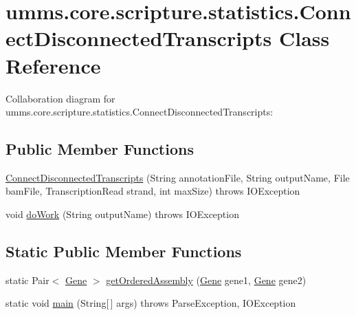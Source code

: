 \hypertarget{classumms_1_1core_1_1scripture_1_1statistics_1_1_connect_disconnected_transcripts}{\section{umms.\+core.\+scripture.\+statistics.\+Connect\+Disconnected\+Transcripts Class Reference}
\label{classumms_1_1core_1_1scripture_1_1statistics_1_1_connect_disconnected_transcripts}
}


Collaboration diagram for umms.\+core.\+scripture.\+statistics.\+Connect\+Disconnected\+Transcripts\+:
\subsection*{Public Member Functions}
\begin{DoxyCompactItemize}
\item 
\hyperlink{classumms_1_1core_1_1scripture_1_1statistics_1_1_connect_disconnected_transcripts_a513b9e39e9fbcfc2db0ccd8135e5b02d}{Connect\+Disconnected\+Transcripts} (String annotation\+File, String output\+Name, File bam\+File, Transcription\+Read strand, int max\+Size)  throws I\+O\+Exception
\item 
void \hyperlink{classumms_1_1core_1_1scripture_1_1statistics_1_1_connect_disconnected_transcripts_a7aca425db9ded34dc2a1010c07859849}{do\+Work} (String output\+Name)  throws I\+O\+Exception
\end{DoxyCompactItemize}
\subsection*{Static Public Member Functions}
\begin{DoxyCompactItemize}
\item 
static Pair$<$ \hyperlink{classumms_1_1core_1_1annotation_1_1_gene}{Gene} $>$ \hyperlink{classumms_1_1core_1_1scripture_1_1statistics_1_1_connect_disconnected_transcripts_ad55264ba1c376afdc3c838f8cf4905d1}{get\+Ordered\+Assembly} (\hyperlink{classumms_1_1core_1_1annotation_1_1_gene}{Gene} gene1, \hyperlink{classumms_1_1core_1_1annotation_1_1_gene}{Gene} gene2)
\item 
static void \hyperlink{classumms_1_1core_1_1scripture_1_1statistics_1_1_connect_disconnected_transcripts_af38763966e52886da840f9f3c625a82e}{main} (String\mbox{[}$\,$\mbox{]} args)  throws Parse\+Exception, I\+O\+Exception 
\end{DoxyCompactItemize}


